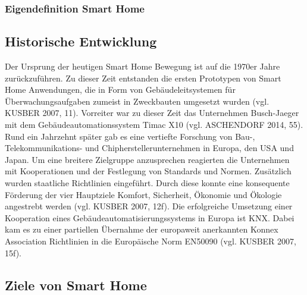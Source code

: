     \subsubsection{Eigendefinition Smart Home}
    
    \subsection{Historische Entwicklung}
        Der Ursprung der heutigen Smart Home Bewegung ist auf die 1970er Jahre zurückzuführen. Zu dieser Zeit entstanden die ersten 
        Prototypen von Smart Home Anwendungen, die in Form von Gebäudeleitsystemen für Überwachungsaufgaben zumeist in Zweckbauten 
        umgesetzt wurden (vgl. KUSBER 2007, 11). Vorreiter war zu dieser Zeit das Unternehmen Busch-Jaeger mit dem 
        Gebäudeautomationssystem Timac X10 (vgl. ASCHENDORF 2014, 55). Rund ein Jahrzehnt später gab es eine vertiefte Forschung 
        von Bau-, Telekommunikations- und Chipherstellerunternehmen in Europa, den USA und Japan. Um eine breitere Zielgruppe 
        anzusprechen reagierten die Unternehmen mit Kooperationen und der Festlegung von Standards und Normen. Zusätzlich wurden 
        staatliche Richtlinien eingeführt. Durch diese konnte eine konsequente Förderung der vier Hauptziele Komfort, Sicherheit, 
        Ökonomie und Ökologie angestrebt werden (vgl. KUSBER 2007, 12f).
        Die erfolgreiche Umsetzung einer Kooperation eines Gebäudeautomatisierungssystems in Europa ist KNX. Dabei kam es zu einer 
        partiellen Übernahme der europaweit anerkannten Konnex Association Richtlinien in die Europäische Norm EN50090 (vgl. KUSBER 2007, 15f).

    \subsection{Ziele von Smart Home}